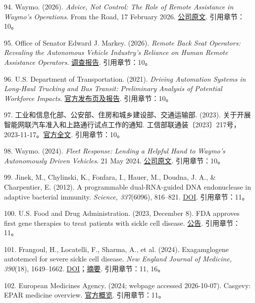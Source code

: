 \documentclass[UTF8,fontset=windows,12pt,a4paper,oneside,openany]{ctexbook}
\begin{document}
94. Waymo. (2026). \emph{Advice, Not Control: The Role of Remote Assistance in Waymo’s Operations}. From the Road, 17 February 2026. \href{https://waymo.com/blog/shorts/advice-not-control-the-role-of-remote-assistance/}{公司原文}.
引用章节：10。

95. Office of Senator Edward J. Markey. (2026). \emph{Remote Back Seat Operators: Revealing the Autonomous Vehicle Industry’s Reliance on Human Remote Assistance Operators}. \href{https://www.markey.senate.gov/imo/media/doc/remote_assistance_investigation_report.pdf}{调查报告}.
引用章节：10。

96. U.S. Department of Transportation. (2021). \emph{Driving Automation Systems in Long-Haul Trucking and Bus Transit: Preliminary Analysis of Potential Workforce Impacts}. \href{https://www.transportation.gov/av/workforce/report}{官方发布页及报告}.
引用章节：10。

97. 工业和信息化部、公安部、住房和城乡建设部、交通运输部. (2023). 关于开展智能网联汽车准入和上路通行试点工作的通知. 工信部联通装〔2023〕217号，2023-11-17。\href{https://ythxxfb.miit.gov.cn/ythzxfwpt/hlwmh/tzgg/xzxk/clsczr/art/2023/art_ae314a1df30e4ba1a49bd4ffa10186f6.html}{官方全文}.
引用章节：10。

98. Waymo. (2024). \emph{Fleet Response: Lending a Helpful Hand to Waymo’s Autonomously Driven Vehicles}. 21 May 2024. \href{https://waymo.com/blog/2024/05/fleet-response/}{公司原文}.
引用章节：10。

99. Jinek, M., Chylinski, K., Fonfara, I., Hauer, M., Doudna, J. A., \& Charpentier, E. (2012). A programmable dual-RNA-guided DNA endonuclease in adaptive bacterial immunity. \emph{Science, 337}(6096), 816–821. \href{https://doi.org/10.1126/science.1225829}{DOI}.
引用章节：11。

100. U.S. Food and Drug Administration. (2023, December 8). FDA approves first gene therapies to treat patients with sickle cell disease. \href{https://www.fda.gov/news-events/press-announcements/fda-approves-first-gene-therapies-treat-patients-sickle-cell-disease}{公告}.
引用章节：11。

101. Frangoul, H., Locatelli, F., Sharma, A., et al. (2024). Exagamglogene autotemcel for severe sickle cell disease. \emph{New England Journal of Medicine, 390}(18), 1649–1662. \href{https://doi.org/10.1056/NEJMoa2309676}{DOI}；\href{https://pubmed.ncbi.nlm.nih.gov/38661449/}{摘要}.
引用章节：11, 16。

102. European Medicines Agency. (2024; webpage accessed 2026-10-07). Casgevy: EPAR medicine overview. \href{https://www.ema.europa.eu/en/medicines/human/EPAR/casgevy}{官方概览}.
引用章节：11。
\end{document}
